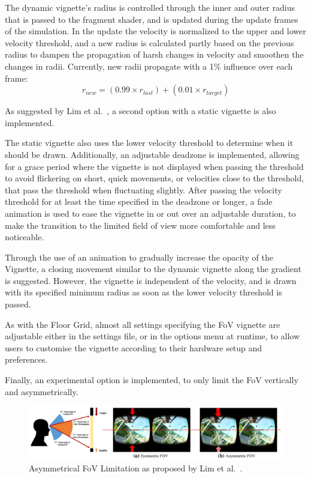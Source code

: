 The dynamic vignette's radius is controlled through the inner and outer radius that is passed to the fragment shader,
and is updated during the update frames of the simulation.
In the update the velocity is normalized to the upper and lower velocity threshold, and a new radius is calculated
partly based on the previous radius to dampen the propagation of harsh changes in velocity and smoothen the changes
in radii.
Currently, new radii propagate with a 1\% influence over each frame:
\begin{equation}
    \label{eq:radii-influence}
    r_{new} = ( 0.99 \times r_{last} ) + ( 0.01 \times r_{target} )
\end{equation}

As suggested by Lim et al.~\cite{Lim2020}, a second option with a static vignette is also implemented.

The static vignette also uses the lower velocity threshold to determine when it should be drawn.
Additionally, an adjustable deadzone is implemented, allowing for a grace period where the vignette is not displayed
when passing the threshold to avoid flickering on short, quick movements, or velocities close to the threshold, that
pass the threshold when fluctuating slightly.
After passing the velocity threshold for at least the time specified in the deadzone or longer, a fade animation is used
to ease the vignette in or out over an adjustable duration, to make the transition to the limited field of view more
comfortable and less noticeable.

Through the use of an animation to gradually increase the opacity of the Vignette, a closing movement similar to the
dynamic vignette along the gradient is suggested.
However, the vignette is independent of the velocity, and is drawn with its specified minimum radius as soon as the
lower velocity threshold is passed.

As with the Floor Grid, almost all settings specifying the FoV vignette are adjustable either in the settings
file, or in the options menu at runtime, to allow users to customise the vignette according to their hardware setup
and preferences.

Finally, an experimental option is implemented, to only limit the FoV vertically and asymmetrically.

\begin{figure}[h]
    \centering
    \includegraphics[width=\textwidth]{content/4_2_fovVignette/img/Asymmetrical_Vignette[Lim2020]}
    \caption{Asymmetrical FoV Limitation as proposed by Lim et al.~\cite{Lim2020}.}
    \label{fig:fov-assymetrical-vignette}
\end{figure}

